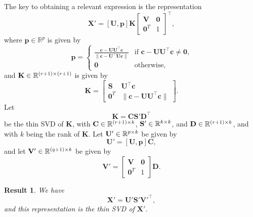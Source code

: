 \documentclass[11pt,a4paper]{article}
\theoremstyle{mybreak}
\numberwithin{dummy}{section}
\theoremstyle{plain}
\newtheorem{result}{Result}[section]
\theoremstyle{plain}
\theoremstyle{plain}
\theoremstyle{plain}
\theoremstyle{MyNonumberplain}
\newcommand{\0}{\M{0}}
\newcommand{\M}[1]{\mathbf{#1}}
\newcommand{\R}{\mathbb{R}}
\newcommand{\T}{\top}
\newcommand{\ve}[1]{\mathbf{#1}}
\newcommand{\Mat}[2]{%
  \ifthenelse{\equal{#2}{1}}
  {\R^{#1}}
  {\R^{#1 \times #2}}
}
\begin{document}
The key to obtaining a relevant expression is the representation
\begin{equation}
  \label{eq:2}
  \M{X}' = [\M{U}, \ve{p}] \M{K}
  \begin{bmatrix}
    \M{V} & \0
    \\
    \0^T & 1
  \end{bmatrix}^\T,
\end{equation}
where $\ve{p} \in \R^p$ is given by
\begin{displaymath}
  \ve{p} =
  \begin{cases}
    \frac{\ve{c} - \M{U} \M{U}^\T \ve{c}}{\| \ve{c} - \M{U}^\T \M{U} \ve{c}\|} & \text{if $\ve{c} - \M{U} \M{U}^\T \ve{c} \neq \0$,}
    \\
    \0 & \text{otherwise,}
  \end{cases}
\end{displaymath}
and $\M{K} \in \Mat{(r+1)}{(r+1)}$ is given by
\begin{displaymath}
  \M{K} =
  \begin{bmatrix}
    \M{S} & \M{U}^\T \ve{c} \\
    \0^T & \| \ve{c} - \M{U} \M{U}^\T \ve{c} \|
  \end{bmatrix}.
\end{displaymath}
Let
\begin{equation}
  \label{eq:3}
  \M{K} = \M{C} \M{S}' \M{D}^\T
\end{equation}
be the thin SVD of $\M{K}$, with $\M{C} \in \Mat{(r+1)}{k}$, $\M{S}' \in \Mat{k}{k}$, and $\M{D} \in \Mat{(r+1)}{k}$, and with $k$ being the rank of $\M{K}$. Let $\M{U}' \in \Mat{p}{k}$ be given by
\begin{equation}
  \label{eq:4}
  \M{U}' = [\M{U}, \ve{p}] \M{C},
\end{equation}
and let $\M{V}' \in \Mat{(q+1)}{k}$ be given by
\begin{equation}
  \label{eq:5}
  \M{V}' =
  \begin{bmatrix}
    \M{V} & \0
    \\
    \0^T & 1
  \end{bmatrix}
  \M{D}.
\end{equation}


\begin{result}
  \label{res:1}
  We have
  \begin{equation}
    \label{eq:6}
    \M{X}' = \M{U}' \M{S}' \M{V}'^\T,
  \end{equation}
  and this representation is the \emph{thin} SVD of $\M{X}'$.
\end{result}
\end{document}

